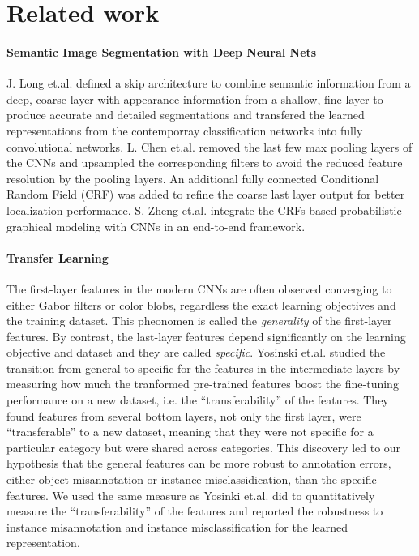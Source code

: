 \section{Related work}
\label{related}

\paragraph{Semantic Image Segmentation with Deep Neural Nets}

J. Long et.al.\cite{long2015fully} defined a skip architecture to combine semantic information from a deep, coarse layer with appearance information from a shallow, fine layer to produce accurate and detailed segmentations and transfered the learned representations from the contemporray classification networks into fully convolutional networks.
L. Chen et.al.\cite{chen2016deeplab} removed the last few max pooling layers of the CNNs and upsampled the corresponding filters to avoid the reduced feature resolution by the pooling layers. An additional fully connected Conditional Random Field (CRF) was added to refine the coarse last layer output for better localization performance.
S. Zheng et.al.\cite{zheng2015conditional} integrate the CRFs-based probabilistic graphical modeling with CNNs in an end-to-end framework.

\paragraph{Transfer Learning}
The first-layer features in the modern CNNs are often observed converging to either Gabor filters or color blobs, regardless the exact learning objectives and the training dataset.
This pheonomen is called the \textit{generality} of the first-layer features.
By contrast, the last-layer features depend significantly on the learning objective and dataset and they are called \textit{specific}.\cite{yosinski2014transferable}
Yosinski et.al.\cite{yosinski2014transferable} studied the transition from general to specific for the features in the intermediate layers by measuring how much the tranformed  pre-trained features boost the fine-tuning performance on a new dataset, i.e. the ``transferability'' of the features.
They found features from several bottom layers, not only the first layer, were ``transferable'' to a new dataset, meaning that they were not specific for a particular category but were shared across categories.
This discovery led to our hypothesis that the general features can be more robust to annotation errors, either object misannotation or instance misclassidication, than the specific features.
We used the same measure as Yosinki et.al. did to quantitatively measure the ``transferability'' of the features and reported the robustness to instance misannotation and instance misclassification for the learned representation.

